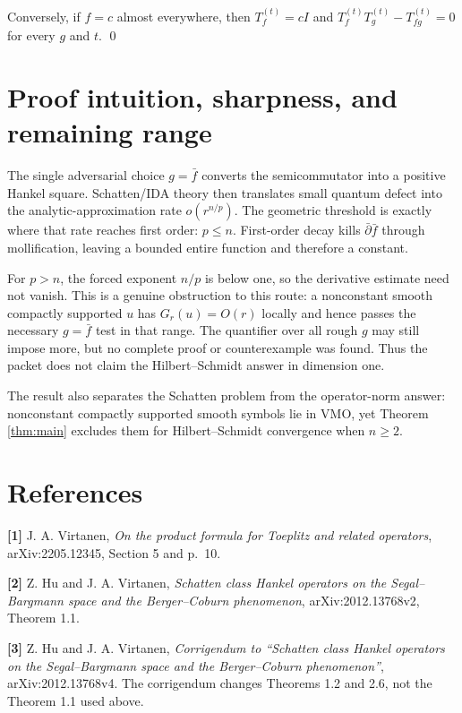 \documentclass[11pt]{article}
\begin{document}
Conversely, if $f=c$ almost everywhere, then $T_f^{(t)}=cI$ and
$T_f^{(t)}T_g^{(t)}-T_{fg}^{(t)}=0$ for every $g$ and $t$. \qed

\section*{Proof intuition, sharpness, and remaining range}
The single adversarial choice $g=\bar f$ converts the semicommutator into a
positive Hankel square.  Schatten/IDA theory then translates small quantum
defect into the analytic-approximation rate $o(r^{n/p})$.  The geometric
threshold is exactly where that rate reaches first order: $p\le n$.
First-order decay kills $\bar\partial\bar f$ through mollification, leaving a
bounded entire function and therefore a constant.

For $p>n$, the forced exponent $n/p$ is below one, so the derivative estimate
need not vanish.  This is a genuine obstruction to this route: a nonconstant
smooth compactly supported $u$ has $G_r(u)=O(r)$ locally and hence passes the
necessary $g=\bar f$ test in that range.  The quantifier over all rough $g$
may still impose more, but no complete proof or counterexample was found.
Thus the packet does not claim the Hilbert--Schmidt answer in dimension one.

The result also separates the Schatten problem from the operator-norm answer:
nonconstant compactly supported smooth symbols lie in VMO, yet Theorem
\ref{thm:main} excludes them for Hilbert--Schmidt convergence when $n\ge2$.

\section*{References}
\begingroup\raggedright
\textbf{[1]} J. A. Virtanen,
\emph{On the product formula for Toeplitz and related operators},
arXiv:2205.12345, Section 5 and p.~10.

\textbf{[2]} Z. Hu and J. A. Virtanen,
\emph{Schatten class Hankel operators on the Segal--Bargmann space and the
Berger--Coburn phenomenon}, arXiv:2012.13768v2, Theorem 1.1.

\textbf{[3]} Z. Hu and J. A. Virtanen,
\emph{Corrigendum to ``Schatten class Hankel operators on the
Segal--Bargmann space and the Berger--Coburn phenomenon''},
arXiv:2012.13768v4.  The corrigendum changes Theorems 1.2 and 2.6, not the
Theorem 1.1 used above.
\par\endgroup
\end{document}
